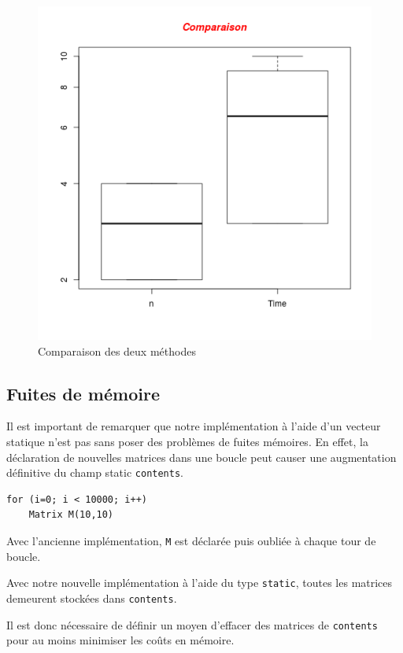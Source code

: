 \documentclass[a4paper,11pt]{article}
\begin{document}
\begin{figure}
  \centering
  \includegraphics[scale=0.5]{Comparison.png}
  \caption{Comparaison des deux méthodes}
  \label{fig:phd}
\end{figure}


\subsection{Fuites de mémoire}

Il est important de remarquer que notre implémentation à l'aide d'un vecteur statique n'est pas sans poser des problèmes de fuites mémoires.
En effet, la déclaration de nouvelles matrices dans une boucle peut causer une augmentation définitive du champ static \texttt{contents}.

\begin{lstlisting}
for (i=0; i < 10000; i++)
    Matrix M(10,10)
\end{lstlisting}


Avec l'ancienne implémentation, \texttt{M} est déclarée puis oubliée à chaque tour de boucle.

Avec notre nouvelle implémentation à l'aide du type \texttt{static}, toutes les matrices demeurent stockées dans \texttt{contents}.

Il est donc nécessaire de définir un moyen d'effacer des matrices de \texttt{contents} pour au moins minimiser les coûts en mémoire.
\end{document}
